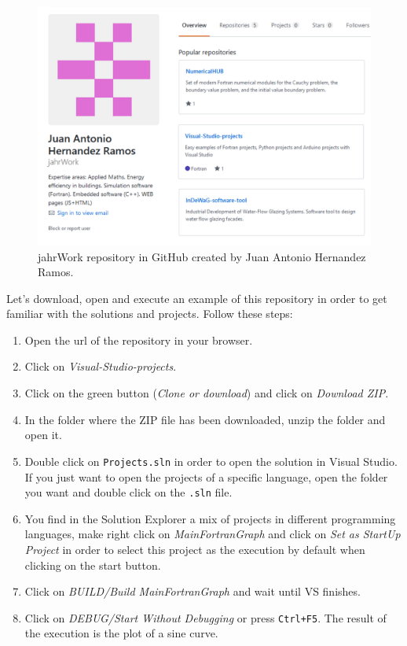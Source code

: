 \begin{figure}
    \centering
    \includegraphics[width= \textwidth]{Figures/repository2}
    \caption{jahrWork repository in GitHub created by Juan Antonio Hernandez Ramos.}
    \label{fig:repository}
\end{figure}

Let's download, open and execute an example of this repository in order to get familiar with the solutions and projects. Follow these steps:

\begin{enumerate}[nosep]
    \item Open the url of the repository in your browser.
    \item Click on \textit{Visual-Studio-projects}.
    \item Click on the green button (\textit{Clone or download}) and click on \textit{Download ZIP}.
    \item In the folder where the ZIP file has been downloaded, unzip the folder and open it. 
    \item Double click on \texttt{Projects.sln} in order to open the solution in Visual Studio. If you just want to open the projects of a specific language, open the folder you want and double click on the \texttt{.sln} file.
    \item You find in the Solution Explorer a mix of projects in different programming languages, make right click on \textit{MainFortranGraph} and click on \textit{Set as StartUp Project} in order to select this project as the execution by default when clicking on the start button.
    \item Click on \textit{BUILD/Build MainFortranGraph} and wait until VS finishes.
    \item Click on \textit{DEBUG/Start Without Debugging} or press \texttt{Ctrl+F5}. The result of the execution is the plot of a sine curve.
\end{enumerate}
 

